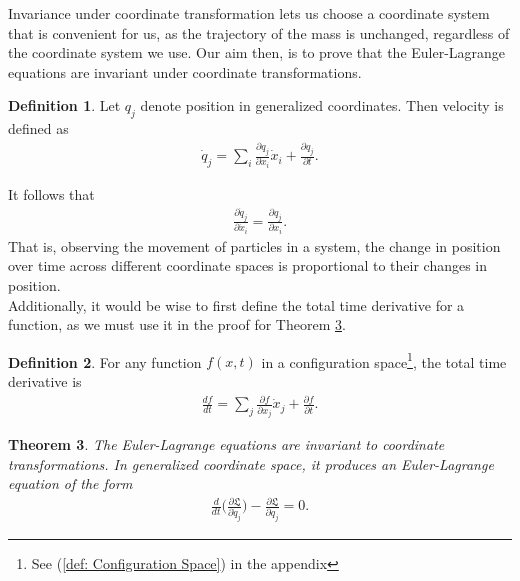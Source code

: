\documentclass[10pt, psamsfonts]{amsart}
\newtheorem{thm}{Theorem}[section]
\theoremstyle{definition}
\newtheorem{defn}[thm]{Definition}
\theoremstyle{remark}
\numberwithin{equation}{section}
\begin{document}
Invariance under coordinate transformation lets us choose a coordinate system that is convenient for us, as the trajectory of the mass is unchanged, regardless of the coordinate system we use. Our aim then, is to prove that the Euler-Lagrange equations are invariant under coordinate transformations.

\begin{defn}
Let $q_j$ denote position in generalized coordinates. Then velocity is defined as
\begin{align}
  \label{eq:Formal Velocity}
  \dot{q}_j = \sum_i \frac{\partial q_j}{\partial x_i} \dot{x}_i + \frac{\partial q_j}{\partial t}. 
\end{align}
\end{defn}
\noindent It follows that
\begin{align}
  \label{eq:Proportionality}
  \frac{\partial \dot{q}_j}{\partial \dot{x}_i} = \frac{\partial q_j}{\partial x_i}.
\end{align}
That is, observing the movement of particles in a system, the change in position over time across different coordinate spaces is proportional to their changes in position.\\

Additionally, it would be wise to first define the total time derivative for a function, as we must use it in the proof for Theorem \ref{thm: Invariance of EL}.
\begin{defn}
    \label{def:Time Deriv Def}
For any function $f(x,t)$ in a configuration space\footnote{See (\ref{def: Configuration Space}) in the appendix}, the total time derivative is
\begin{align}
  \label{eq:Time Derivative}
  \frac{df}{dt} = \sum_j \frac{\partial f}{\partial x_j} \dot{x}_j + \frac{\partial f}{\partial t}. 
\end{align}
\end{defn}

\begin{thm}
    \label{thm: Invariance of EL}
  The Euler-Lagrange equations are invariant to coordinate transformations. In generalized coordinate space, it produces an Euler-Lagrange equation of the form
  \begin{align*}
    \frac{d}{dt} \bigg( \frac{\partial \mathfrak{L}}{\partial \dot{q}_j}  \bigg) - \frac{\partial \mathfrak{L} }{\partial q_j} = 0.
  \end{align*}
\end{thm}
\end{document}
